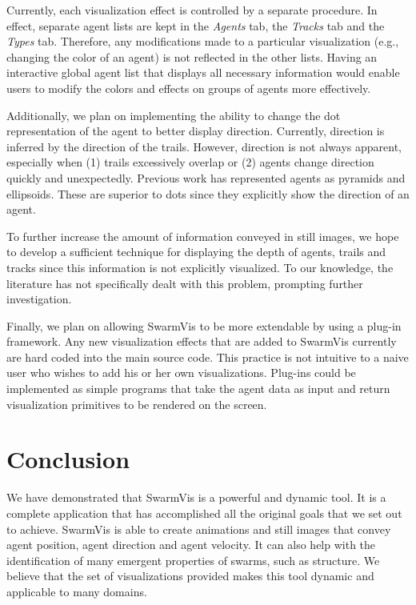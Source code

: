 \documentclass{vgtc}
\begin{document}
Currently, each visualization effect is controlled by a separate procedure.
In effect, separate agent lists are kept in the \textit{Agents} tab, the \textit{Tracks} tab and the \textit{Types} tab.
Therefore, any modifications made to a particular visualization (e.g., changing the color of an agent) is not reflected in the other lists.
Having an interactive global agent list that displays all necessary information would enable users to modify
the colors and effects on groups of agents more effectively. 

Additionally, we plan on implementing the ability to change the dot representation of the agent to better display direction.
Currently, direction is inferred by the direction of the trails.
However, direction is not always apparent,
especially when (1) trails excessively overlap or (2) agents change direction quickly and unexpectedly.
Previous work has represented agents as  pyramids\cite{spector2005ecb}  and ellipsoids\cite{10.1109/TVCG.2005.87}.
These are superior to dots since they explicitly show the direction of an agent.

To further increase the amount of information conveyed in still images,
we hope to develop a sufficient technique for displaying the depth of
agents, trails and tracks since this information is not explicitly visualized.
To our knowledge, the literature has not specifically dealt with this problem, prompting further investigation.

Finally, we plan on allowing SwarmVis to be more extendable by using a plug-in framework.
Any new visualization effects that are added to SwarmVis currently are hard coded into the main source code. This practice is not intuitive to a naive user who wishes to add his or her own visualizations.
Plug-ins could be implemented as simple programs that take the agent data as input and return
visualization primitives to be rendered on the screen.



\section{Conclusion}
We have demonstrated that SwarmVis is a powerful and dynamic tool.
It is a complete application that has accomplished all the original goals that we set out to achieve.
SwarmVis is able to create animations and still images that convey agent position, agent direction and agent velocity.
It can also help with the identification of many emergent properties of swarms, such as structure.
We believe that the set of visualizations provided makes this tool dynamic and applicable to many domains.
\end{document}
